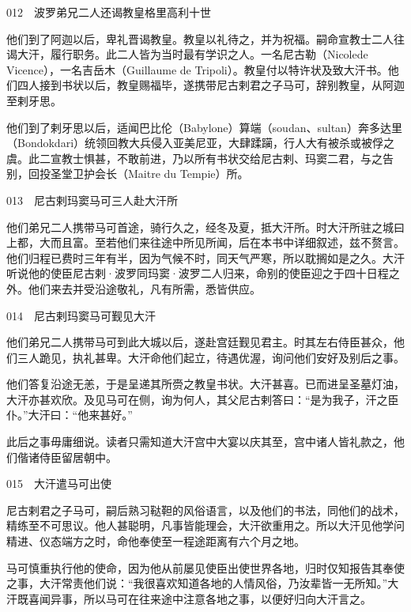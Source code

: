 \documentclass[12pt,UTF8]{ctexbook}
\begin{document}
012　波罗弟兄二人还谒教皇格里高利十世

他们到了阿迦以后，卑礼晋谒教皇。教皇以礼待之，并为祝福。嗣命宣教士二人往谒大汗，履行职务。此二人皆为当时最有学识之人。一名尼古勒（Nicolede Vicence），一名吉岳木（Guillaume de Tripoli）。教皇付以特许状及致大汗书。他们四人接到书状以后，教皇赐福毕，遂携带尼古剌君之子马可，辞别教皇，从阿迦至剌牙思。

他们到了剌牙思以后，适闻巴比伦（Babylone）算端（soudan、sultan）奔多达里（Bondokdari）统领回教大兵侵入亚美尼亚，大肆蹂躏，行人大有被杀或被俘之虞。此二宣教士惧甚，不敢前进，乃以所有书状交给尼古剌、玛窦二君，与之告别，回投圣堂卫护会长（Maitre du Tempie）所。





013　尼古剌玛窦马可三人赴大汗所

他们弟兄二人携带马可首途，骑行久之，经冬及夏，抵大汗所。时大汗所驻之城曰上都，大而且富。至若他们来往途中所见所闻，后在本书中详细叙述，兹不赘言。他们归程已费时三年有半，因为气候不时，同天气严寒，所以耽搁如是之久。大汗听说他的使臣尼古剌·波罗同玛窦·波罗二人归来，命别的使臣迎之于四十日程之外。他们来去并受沿途敬礼，凡有所需，悉皆供应。





014　尼古剌玛窦马可觐见大汗

他们弟兄二人携带马可到此大城以后，遂赴宫廷觐见君主。时其左右侍臣甚众，他们三人跪见，执礼甚卑。大汗命他们起立，待遇优渥，询问他们安好及别后之事。

他们答复沿途无恙，于是呈递其所赍之教皇书状。大汗甚喜。已而进呈圣墓灯油，大汗亦甚欢欣。及见马可在侧，询为何人，其父尼古剌答曰：“是为我子，汗之臣仆。”大汗曰：“他来甚好。”

此后之事毋庸细说。读者只需知道大汗宫中大宴以庆其至，宫中诸人皆礼款之，他们偕诸侍臣留居朝中。





015　大汗遣马可出使

尼古剌君之子马可，嗣后熟习鞑靼的风俗语言，以及他们的书法，同他们的战术，精练至不可思议。他人甚聪明，凡事皆能理会，大汗欲重用之。所以大汗见他学问精进、仪态端方之时，命他奉使至一程途距离有六个月之地。

马可慎重执行他的使命，因为他从前屡见使臣出使世界各地，归时仅知报告其奉使之事，大汗常责他们说：“我很喜欢知道各地的人情风俗，乃汝辈皆一无所知。”大汗既喜闻异事，所以马可在往来途中注意各地之事，以便好归向大汗言之。
\end{document}
